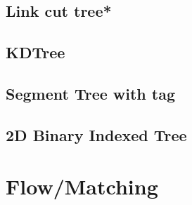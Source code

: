\subsection{Link cut tree*} %

\subsection{KDTree}

\subsection{Segment Tree with tag}

\subsection{2D Binary Indexed Tree}



\section{Flow/Matching}
